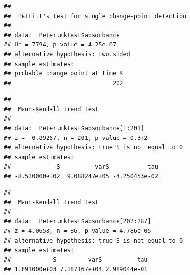 \documentclass[12pt,]{article}
\newenvironment{Shaded}{\begin{snugshade}}{\end{snugshade}}
\newcommand{\KeywordTok}[1]{\textcolor[rgb]{0.13,0.29,0.53}{\textbf{#1}}}
\newcommand{\DecValTok}[1]{\textcolor[rgb]{0.00,0.00,0.81}{#1}}
\newcommand{\CommentTok}[1]{\textcolor[rgb]{0.56,0.35,0.01}{\textit{#1}}}
\newcommand{\OperatorTok}[1]{\textcolor[rgb]{0.81,0.36,0.00}{\textbf{#1}}}
\newcommand{\NormalTok}[1]{#1}
\begin{document}
\begin{Shaded}
\end{Shaded}

\begin{verbatim}
## 
##  Pettitt's test for single change-point detection
## 
## data:  Peter.mktest$absorbance
## U* = 7794, p-value = 4.25e-07
## alternative hypothesis: two.sided
## sample estimates:
## probable change point at time K 
##                             202
\end{verbatim}

\begin{Shaded}
\end{Shaded}

\begin{verbatim}
## 
##  Mann-Kendall trend test
## 
## data:  Peter.mktest$absorbance[1:201]
## z = -0.89267, n = 201, p-value = 0.372
## alternative hypothesis: true S is not equal to 0
## sample estimates:
##             S          varS           tau 
## -8.520000e+02  9.088247e+05 -4.250453e-02
\end{verbatim}

\begin{Shaded}
\end{Shaded}

\begin{verbatim}
## 
##  Mann-Kendall trend test
## 
## data:  Peter.mktest$absorbance[202:287]
## z = 4.0658, n = 86, p-value = 4.786e-05
## alternative hypothesis: true S is not equal to 0
## sample estimates:
##            S         varS          tau 
## 1.091000e+03 7.187167e+04 2.989044e-01
\end{verbatim}
\end{document}
